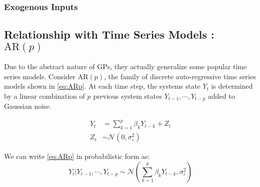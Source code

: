 \subsubsection*{Exogenous Inputs}



\subsection*{Relationship with Time Series Models : $\mathrm{AR}(p)$}

Due to the abstract nature of GPs, they actually generalize some popular time series models. Consider $\mathrm{AR}(p)$, the family of discrete 
auto-regressive time series models shown in \cref{eq:ARp}. At each time step, the systems state $Y_t$ is determined by a linear combination 
of $p$ previous system states $Y_{t-1}, \cdots, Y_{t-p}$ added to Gaussian noise.  

\begin{align}
    Y_t &= \sum^{p}_{k = 1}{\beta_{k}Y_{t-k}} + Z_t \label{eq:ARp} \\
    Z_t &\sim \mathcal{N}(0, \sigma^{2}_{\varepsilon})
\end{align}

We can write \cref{eq:ARp} in probabilistic form as: 
\begin{equation*}
    Y_t \rvert Y_{t-1}, \cdots, Y_{t-p} \sim \mathcal{N}(\sum^{p}_{k = 1}{\beta_{k}Y_{t-k}}, \sigma^{2}_{\varepsilon})
\end{equation*}



